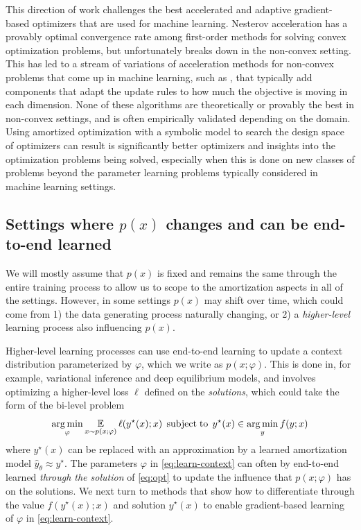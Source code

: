 \documentclass[twoside,11pt]{article}
\begin{document}
This direction of work challenges the best accelerated and adaptive
gradient-based optimizers that are used for machine learning.
Nesterov acceleration \citep{nesterov1983method} has a provably
optimal convergence rate among first-order methods for solving
convex optimization problems, but unfortunately breaks down
in the non-convex setting.
This has led to a stream of variations of acceleration methods
for non-convex problems that come up in machine learning,
such as \citet{duchi2011adaptive,zeiler2012adadelta,kingma2014adam},
that typically add components that adapt the update rules to
how much the objective is moving in each dimension.
None of these algorithms are theoretically or provably the
best in non-convex settings, and is often empirically validated
depending on the domain.
Using amortized optimization with a symbolic model to search
the design space of optimizers can result is significantly
better optimizers and insights into the optimization problems
being solved, especially when this is done on new classes
of problems beyond the parameter learning problems typically
considered in machine learning settings.


\subsection{Settings where $p(x)$ changes and can be end-to-end learned}
We will mostly assume that $p(x)$ is fixed and remains
the same through the entire training process to allow us
to scope to the amortization aspects in all of the settings.
However, in some settings $p(x)$ may shift over time, which
could come from 1) the data generating process naturally
changing, or 2) a \emph{higher-level} learning process
also influencing $p(x)$.

Higher-level learning processes can use end-to-end learning
to update a context distribution parameterized by
$\varphi$, which we write as $p(x; \varphi)$.
This is done in, for example, variational inference
and deep equilibrium models, and involves optimizing
a higher-level loss $\ell$ defined on the \emph{solutions},
which could take the form of the bi-level problem
\begin{equation}
  \operatorname*{arg\,min}_{\varphi} \operatorname*{\mathbb{E}}_{x\sim p(x; \varphi)} \ell(y^\star(x); x)\;
  \operatorname*{subject\;to}\; y^\star(x)\in\operatorname*{arg\,min}_y f(y; x)
\label{eq:learn-context}
\end{equation}
where $y^\star(x)$ can be replaced with an approximation
by a learned amortization model $\hat y_\theta \approx y^\star$.
The parameters $\varphi$ in \cref{eq:learn-context} can
often by end-to-end learned \emph{through the solution} of
\cref{eq:opt} to update the influence that $p(x; \varphi)$
has on the solutions.
We next turn to methods that show how to differentiate
through the value $f(y^\star(x); x)$ and solution
$y^\star(x)$ to enable gradient-based learning of
$\varphi$ in \cref{eq:learn-context}.
\end{document}
